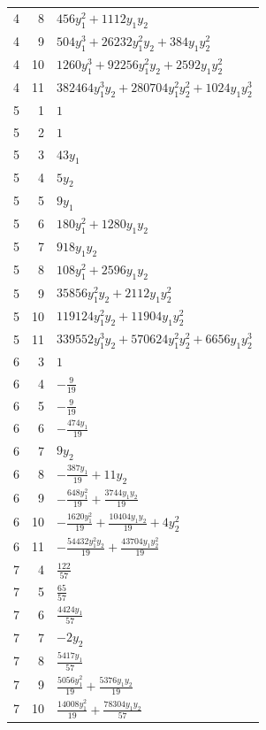 \documentclass[10pt,a4paper]{article}
\begin{document}
{\begin{longtable}{rrp{125mm}}
4 & 8 & $456 y_{1}^{2} + 1112 y_{1} y_{2}$\\
4 & 9 & $504 y_{1}^{3} + 26232 y_{1}^{2} y_{2} + 384 y_{1} y_{2}^{2}$\\
4 & 10 & $1260 y_{1}^{3} + 92256 y_{1}^{2} y_{2} + 2592 y_{1} y_{2}^{2}$\\
4 & 11 & $382464 y_{1}^{3} y_{2} + 280704 y_{1}^{2} y_{2}^{2} + 1024 y_{1} y_{2}^{3}$\\
5 & 1 & $1$\\
5 & 2 & $1$\\
5 & 3 & $43 y_{1}$\\
5 & 4 & $5 y_{2}$\\
5 & 5 & $9 y_{1}$\\
5 & 6 & $180 y_{1}^{2} + 1280 y_{1} y_{2}$\\
5 & 7 & $918 y_{1} y_{2}$\\
5 & 8 & $108 y_{1}^{2} + 2596 y_{1} y_{2}$\\
5 & 9 & $35856 y_{1}^{2} y_{2} + 2112 y_{1} y_{2}^{2}$\\
5 & 10 & $119124 y_{1}^{2} y_{2} + 11904 y_{1} y_{2}^{2}$\\
5 & 11 & $339552 y_{1}^{3} y_{2} + 570624 y_{1}^{2} y_{2}^{2} + 6656 y_{1} y_{2}^{3}$\\
6 & 3 & $1$\\
6 & 4 & $- \frac{9}{19}$\\
6 & 5 & $- \frac{9}{19}$\\
6 & 6 & $- \frac{474 y_{1}}{19}$\\
6 & 7 & $9 y_{2}$\\
6 & 8 & $- \frac{387 y_{1}}{19} + 11 y_{2}$\\
6 & 9 & $- \frac{648 y_{1}^{2}}{19} + \frac{3744 y_{1} y_{2}}{19}$\\
6 & 10 & $- \frac{1620 y_{1}^{2}}{19} + \frac{10404 y_{1} y_{2}}{19} + 4 y_{2}^{2}$\\
6 & 11 & $- \frac{54432 y_{1}^{2} y_{2}}{19} + \frac{43704 y_{1} y_{2}^{2}}{19}$\\
7 & 4 & $\frac{122}{57}$\\
7 & 5 & $\frac{65}{57}$\\
7 & 6 & $\frac{4424 y_{1}}{57}$\\
7 & 7 & $- 2 y_{2}$\\
7 & 8 & $\frac{5417 y_{1}}{57}$\\
7 & 9 & $\frac{5056 y_{1}^{2}}{19} + \frac{5376 y_{1} y_{2}}{19}$\\
7 & 10 & $\frac{14008 y_{1}^{2}}{19} + \frac{78304 y_{1} y_{2}}{57}$\\

\end{longtable}}
\end{document}
